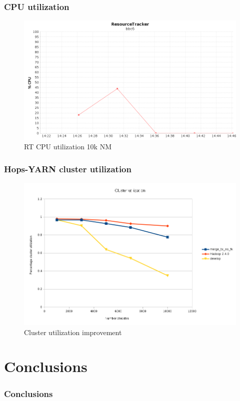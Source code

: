 \documentclass{beamer}
\begin{document}
\begin{frame}
\frametitle{CPU utilization}

\begin{figure}
\centering
\includegraphics[scale=0.3]{resources/RT_CPU_ALL_CPU.png}
\caption{RT CPU utilization 10k NM}
\end{figure}
\end{frame}

\begin{frame}
\frametitle{Hops-YARN cluster utilization}

\begin{figure}
\centering
\includegraphics[scale=0.4]{resources/hopsyarn_cluster_util.png}
\caption{Cluster utilization improvement}
\end{figure}
\end{frame}

\section{Conclusions}
\begin{frame}
\frametitle{Conclusions}
\end{frame}
\end{document}
